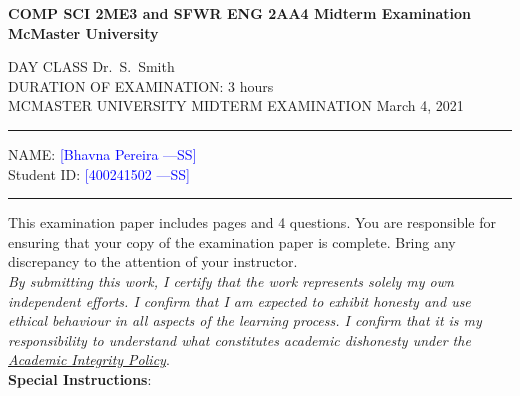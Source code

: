 \documentclass[12pt,fleqn]{examtst}
\newcommand{\authornote}[3]{\textcolor{#1}{[#3 ---#2]}}
\newcommand{\authornote}[3]{}
\newcommand{\wss}[1]{\authornote{blue}{SS}{#1}}
\begin{document}
\newcommand{\soln}{n} %

\lstset{language=python, basicstyle=\ttfamily, breaklines=true,
  showspaces=false, showstringspaces=false, breakatwhitespace=true}

\newcommand{\codeit}[1]{\texttt{\textit{#1}}}

\begin{center}
  {\large \bf COMP SCI 2ME3 and SFWR ENG 2AA4 Midterm Examination}\\[1ex]
  {\large \bf McMaster University}\\[1ex]
  \ifthenelse{\equal{\soln}{y}}{\large {\bf ANSWER KEY} %
  }{}
\end{center}

\medskip

\noindent
DAY CLASS%
\hfill Dr.~S.~Smith \\
DURATION OF EXAMINATION: 3 hours \\
MCMASTER UNIVERSITY MIDTERM EXAMINATION \hfill March 4, 2021

\medskip

\noindent
\rule[3 mm]{\textwidth}{0.5mm}


NAME: \wss{Bhavna Pereira}\\[1ex]

Student ID: \wss{400241502} \\[2mm]

\noindent
\rule[3 mm]{\textwidth}{0.5mm}

This examination paper includes \noofpages pages and
4 %
questions. You are responsible for ensuring that your copy of the examination
paper is complete. Bring any discrepancy to the attention
of your instructor.\\

\noindent
\emph{By submitting this work, I certify that the work represents solely my own
independent efforts. I confirm that I am expected to exhibit honesty and use
ethical behaviour in all aspects of the learning process.  I confirm that it is
my responsibility to understand what constitutes academic dishonesty under the
\href{https://secretariat.mcmaster.ca/app/uploads/Academic-Integrity-Policy-1-1.pdf}
{Academic Integrity Policy}}.\\

\noindent
\textbf{Special Instructions}:
\end{document}
